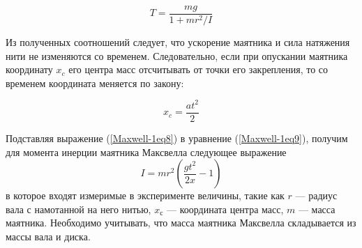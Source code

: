 \documentclass[14pt,a4paper,oneside]{extarticle}	%
\begin{document}
	\begin{equation}\label{Maxwell-1eq8}
	T = \frac{mg}{1 + mr^2/I}
	\end{equation}
	
	Из полученных соотношений следует, что ускорение маятника и сила натяжения нити не изменяются со временем. 
	Следовательно, если при опускании маятника координату $ x_c $ его центра масс отсчитывать от точки его закрепления, то со временем координата меняется по закону:
	
	\begin{equation}\label{Maxwell-1eq9}
	x_c = \frac{at^{2}}{2}
	\end{equation}
	
	Подставляя выражение (\ref{Maxwell-1eq8}) в уравнение (\ref{Maxwell-1eq9}), получим для момента инерции маятника Максвелла следующее выражение
	\begin{equation}\label{Maxwell-1eq10}
	I = mr^{2}\left(\frac{gt^{2}}{2x} - 1 \right) 
	\end{equation}
	в которое входят измеримые в эксперименте величины, такие как $ r $ — радиус вала с намотанной на него нитью, $ x_с $ — координата центра масс, $ m $ — масса маятника.
	Необходимо учитывать, что масса маятника Максвелла складывается из массы вала и диска.
	
	
\end{document}
